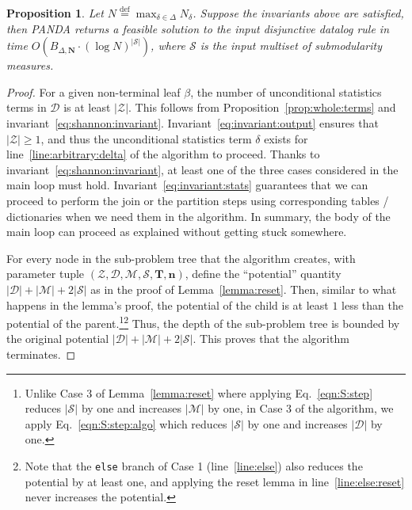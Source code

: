 \documentclass[10pt,a4paper]{article}
\newtheorem{proposition}{Proposition}[section]
\newcommand{\calM}{\mathcal M}
\newcommand{\calS}{\mathcal S}
\newcommand{\calD}{\mathcal D}
\newcommand{\calZ}{\mathcal Z}
\newcommand{\defeq}{\stackrel{\text{def}}{=}}
\newcommand{\panda}{\textsf{PANDA}\xspace}
\begin{document}
\begin{proposition}
Let $N \defeq \max_{\delta \in \Delta} N_\delta$.
Suppose the invariants above are satisfied, then \panda returns a feasible solution
to the input disjunctive datalog rule in time $O(B_{\Delta, \bm N} \cdot (\log N)^{|\calS|})$,
where $\calS$ is the {\em input} multiset of submodularity measures.
\label{prop:correctness}
\end{proposition}
\begin{proof}
  For a given non-terminal leaf $\beta$, the number of unconditional statistics terms
  in $\calD$ is at least $|\calZ|$. This follows from Proposition~\ref{prop:whole:terms}
  and invariant~\eqref{eq:shannon:invariant}. Invariant~\eqref{eq:invariant:output} ensures
  that $|\calZ| \geq 1$, and thus the unconditional statistics term $\delta$ exists
  for line~\ref{line:arbitrary:delta} of the algorithm to proceed.
  Thanks to invariant~\eqref{eq:shannon:invariant},
  at least one of the three cases considered in the main loop must hold.
  Invariant~\eqref{eq:invariant:stats} guarantees that we can proceed to perform the join
  or the partition steps using corresponding tables / dictionaries when we need them
  in the algorithm.
  In summary, the body of the main loop can proceed as explained without getting stuck
  somewhere.

  For every node in the sub-problem tree that the algorithm creates, with parameter tuple
  $(\calZ, \calD, \calM, \calS, \bm T, \bm n)$, define the ``potential'' quantity
  $|\calD|+|\calM|+2|\calS|$ as in the proof of Lemma~\ref{lemma:reset}.
  Then, similar to what happens in the lemma's proof, the potential of the child is at least
  $1$ less than the potential of the parent.\footnote{Unlike Case 3 of Lemma~\ref{lemma:reset}
  where applying Eq.~\eqref{eqn:S:step} reduces $|\calS|$ by one and increases $|\calM|$ by one,
  in Case 3 of the algorithm, we apply Eq.~\eqref{eqn:S:step:algo} which reduces $|\calS|$ by one and increases $|\calD|$ by one.}\footnote{Note that the {\tt else} branch of Case 1 (line~\ref{line:else}) also reduces the potential by at least one, and applying the reset lemma in line~\ref{line:else:reset} never increases the potential.} Thus, the depth of the sub-problem tree
  is bounded by the original potential $|\calD|+|\calM|+2|\calS|$.
  This proves that the algorithm terminates.


\end{proof}
\end{document}
